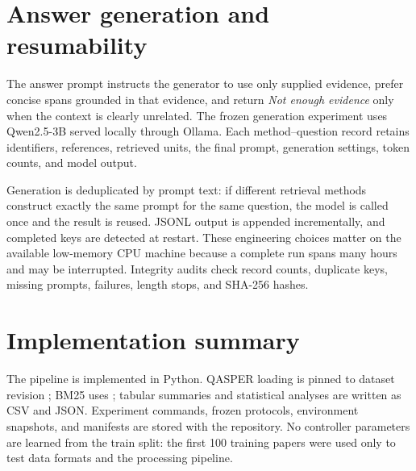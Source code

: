 \section{Answer generation and resumability}

The answer prompt instructs the generator to use only supplied evidence, prefer concise spans grounded in that evidence, and return \emph{Not enough evidence} only when the context is clearly unrelated. The frozen generation experiment uses Qwen2.5-3B served locally through Ollama. Each method--question record retains identifiers, references, retrieved units, the final prompt, generation settings, token counts, and model output.

Generation is deduplicated by prompt text: if different retrieval methods construct exactly the same prompt for the same question, the model is called once and the result is reused. JSONL output is appended incrementally, and completed keys are detected at restart. These engineering choices matter on the available low-memory CPU machine because a complete run spans many hours and may be interrupted. Integrity audits check record counts, duplicate keys, missing prompts, failures, length stops, and SHA-256 hashes.

\section{Implementation summary}

The pipeline is implemented in Python. QASPER loading is pinned to dataset revision ; BM25 uses ; tabular summaries and statistical analyses are written as CSV and JSON. Experiment commands, frozen protocols, environment snapshots, and manifests are stored with the repository. No controller parameters are learned from the train split: the first 100 training papers were used only to test data formats and the processing pipeline.

